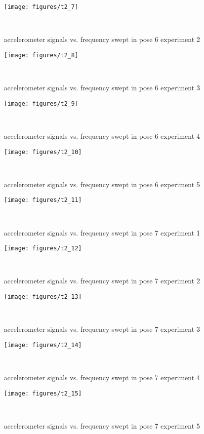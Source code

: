 \documentclass{sigchi}
\begin{document}
\begin{figure*}
  \centering
  \texttt{[image: figures/t2\_7]}
  \caption{accelerometer signals vs. frequency swept in pose 6 experiment 2}
    ~\label{fig:t2_7}
\end{figure*}

\begin{figure*}
  \centering
  \texttt{[image: figures/t2\_8]}
  \caption{accelerometer signals vs. frequency swept in pose 6 experiment 3}
    ~\label{fig:t2_8}
\end{figure*}

\begin{figure*}
  \centering
  \texttt{[image: figures/t2\_9]}
  \caption{accelerometer signals vs. frequency swept in pose 6 experiment 4}
    ~\label{fig:t2_9}
\end{figure*}

\begin{figure*}
  \centering
  \texttt{[image: figures/t2\_10]}
  \caption{accelerometer signals vs. frequency swept in pose 6 experiment 5}
    ~\label{fig:t2_10}
\end{figure*}

\begin{figure*}
  \centering
  \texttt{[image: figures/t2\_11]}
  \caption{accelerometer signals vs. frequency swept in pose 7 experiment 1}
    ~\label{fig:t2_11}
\end{figure*}

\begin{figure*}
  \centering
  \texttt{[image: figures/t2\_12]}
  \caption{accelerometer signals vs. frequency swept in pose 7 experiment 2}
    ~\label{fig:t2_12}
\end{figure*}

\begin{figure*}
  \centering
  \texttt{[image: figures/t2\_13]}
  \caption{accelerometer signals vs. frequency swept in pose 7 experiment 3}
    ~\label{fig:t2_13}
\end{figure*}

\begin{figure*}
  \centering
  \texttt{[image: figures/t2\_14]}
  \caption{accelerometer signals vs. frequency swept in pose 7 experiment 4}
    ~\label{fig:t2_14}
\end{figure*}

\begin{figure*}
  \centering
  \texttt{[image: figures/t2\_15]}
  \caption{accelerometer signals vs. frequency swept in pose 7 experiment 5}
    ~\label{fig:t2_15}
\end{figure*}
\end{document}

